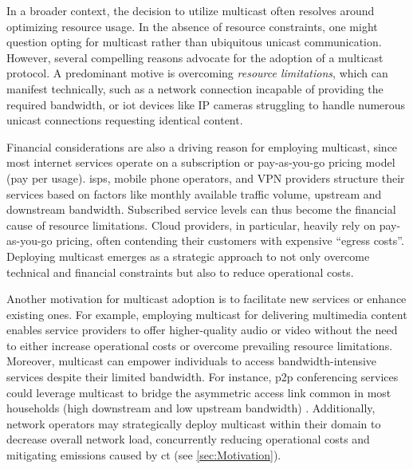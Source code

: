 In a broader context, the decision to utilize multicast often resolves around
    optimizing resource usage.
In the absence of resource constraints, one might question opting for multicast
    rather than ubiquitous unicast communication.
However, several compelling reasons advocate for the adoption of a multicast
    protocol.
A predominant motive is overcoming \textit{resource limitations}, which can
    manifest technically, such as a network connection incapable of providing
    the required bandwidth, or \gls{iot} devices like IP cameras struggling
    to handle numerous unicast connections requesting identical content.

Financial considerations are also a driving reason for employing multicast,
since most internet services operate on a subscription or pay-as-you-go pricing
    model (pay per usage).
\glspl{isp}, mobile phone operators, and VPN providers structure their services
    based on factors like monthly available traffic volume, upstream and
    downstream bandwidth.
Subscribed service levels can thus become the financial cause of resource
    limitations.
Cloud providers, in particular, heavily rely on pay-as-you-go pricing, often
    contending their customers with expensive ``egress costs''.
Deploying multicast emerges as a strategic approach to not only overcome
    technical and financial constraints but also to reduce operational costs.

Another motivation for multicast adoption is to facilitate new services or 
    enhance existing ones.
For example, employing multicast for delivering multimedia content enables
    service providers to offer higher-quality audio or video without the need
    to either increase operational costs or overcome prevailing resource
    limitations.
Moreover, multicast can empower individuals to access bandwidth-intensive
    services despite their limited bandwidth.
For instance, \gls{p2p} conferencing services could leverage multicast to
    bridge the asymmetric access link common in most households (high
    downstream and low upstream bandwidth) \cite{xcast_rfc}.
Additionally, network operators may strategically deploy multicast within their
    domain to decrease overall network load, concurrently reducing operational
    costs and mitigating emissions caused by \gls{ct} (see
    \autoref{sec:Motivation}).

